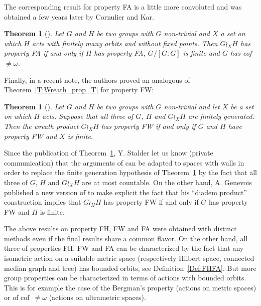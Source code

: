 \documentclass[a4paper]{article}
\newtheorem{thm}[lem]{Theorem}
\theoremstyle{definition}
\begin{document}
The corresponding result for property FA is a little more convoluted and was obtained a few years later by Cornulier and Kar.
%
%
\begin{thm}[\cite{Cornulier2011}]\label{Thm:FACK}
Let $G$ and $H$ be two groups with $G$ non-trivial and $X$ a set on which $H$ acts with finitely many orbits and without fixed points.
Then $G\wr_XH$ has property FA if and only if $H$ has property FA, $G/[G:G]$ is finite and $G$ has cof~$\neq\omega$.
\end{thm}
%
%
Finally, in a recent note, the authors proved an analogous of Theorem~\ref{T:Wreath_prop_T} for property FW:
%
%
\begin{thm}[\cite{LS2020}]\label{Thm:PropFW}
Let $G$ and $H$ be two groups with $G$ non-trivial and let $X$ be a set on which $H$ acts. Suppose that all three of $G$, $H$ and $G\wr_XH$ are finitely generated. Then the wreath product $G \wr_X H$ has property FW if and only if $G$ and $H$ have property FW and $X$ is finite.
\end{thm}
%
%
Since the publication of Theorem~\ref{Thm:PropFW}, Y. Stalder let us know (private communication) that the arguments of \cite{LS2020} can be adapted to spaces with walls in order to replace the finite generation hypothesis of Theorem~\ref{Thm:PropFW} by the fact that all three of $G$, $H$ and $G\wr_XH$ are at most countable.
On the other hand, A. Genevois published a new version of \cite{2017arXiv170500834G} to make explicit the fact that his ``diadem product'' construction implies that $G\wr_HH$ has property FW if and only if $G$ has property FW and $H$ is finite.

The above results on property FH, FW and FA were obtained with distinct methods even if the final results share a common flavor.
On the other hand, all three of properties FH, FW and FA can be characterized by the fact that any isometric action on a suitable metric space (respectively Hilbert space, connected median graph and tree) has bounded orbits, see Definition~\ref{Def:FHFA}.
But more group properties can be characterized in terms of actions with bounded orbits. This is for example the case of the Bergman's property (actions on metric spaces) or of cof~$\neq\omega$ (actions on ultrametric spaces).
\end{document}
